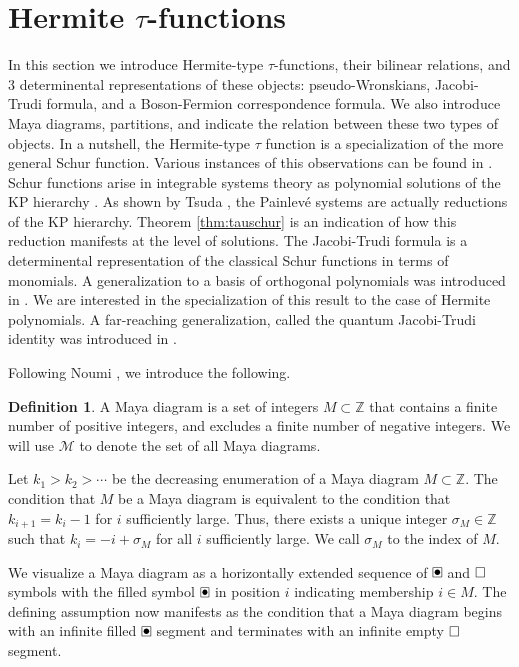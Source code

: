 \documentclass{amsart}
\theoremstyle{definition}
\newtheorem{definition}{Definition}
\newcommand{\Z}{\mathbb{Z}}
\newcommand{\cM}{\mathcal{M}}
\renewcommand{\boxdot}{{\ \clap{\raise0.25ex\hbox{$\bullet$}}\clap{$\square$}\ }}
\newcommand{\emptybox}{\hbox{$\square$}}
\begin{document}
\section{Hermite $\tau$-functions
}\label{sec:Maya}

In this section we introduce Hermite-type $\tau$-functions, their
bilinear relations, and 3 determinental representations of these
objects: pseudo-Wronskians, Jacobi-Trudi formula, and a Boson-Fermion
correspondence formula.  We also introduce Maya diagrams, partitions,
and indicate the relation between these two types of objects.  In a
nutshell, the Hermite-type $\tau$ function is a specialization of the
more general Schur function.  Various instances of this observations
can be found in \cite{clarkson2006specialsoliton}.  Schur functions
arise in integrable systems theory as polynomial solutions of the KP
hierarchy \cite{wilson1993bispectral}. As shown by Tsuda
\cite{tsuda2005universal}, the Painlev\'e systems are actually
reductions of the KP hierarchy.  Theorem \ref{thm:tauschur} is an
indication of how this reduction manifests at the level of solutions.
The Jacobi-Trudi formula is a determinental representation of the
classical Schur functions in terms of monomials.  A generalization to
a basis of orthogonal polynomials was introduced in
\cite{veselovsergeev}. We are interested in the specialization of this
result to the case of Hermite polynomials. A far-reaching
generalization, called the quantum Jacobi-Trudi identity was
introduced in \cite{harnadlee}.


Following Noumi \cite{noumi2004painleve}, we introduce the following.
\begin{definition}
  A Maya diagram is a set of integers $M\subset \Z$ that contains a
  finite number of positive integers, and excludes a finite number of
  negative integers.  We will use $\cM$ to denote the set of all Maya
  diagrams.

  Let $k_1 > k_2> \cdots$ be the decreasing enumeration of a Maya
  diagram $M\subset \Z$.  The condition that $M$ be a Maya diagram is
  equivalent to the condition that $k_{i+1} = k_i-1$ for $i$
  sufficiently large.  Thus, there exists a unique integer
  $\sigma_M\in \Z$ such that $k_i = -i+\sigma_M$ for all $i$
  sufficiently large. We call $\sigma_M$ to the index of $M$.
\end{definition}

We visualize a Maya diagram as a horizontally extended sequence of
$\boxdot$ and $\emptybox$ symbols with the filled symbol $\boxdot$ in
position $i$ indicating membership $i\in M$. The defining assumption
now manifests as the condition that a Maya diagram begins with an
infinite filled $\boxdot$ segment and terminates with an infinite
empty $\emptybox$ segment.
\end{document}
